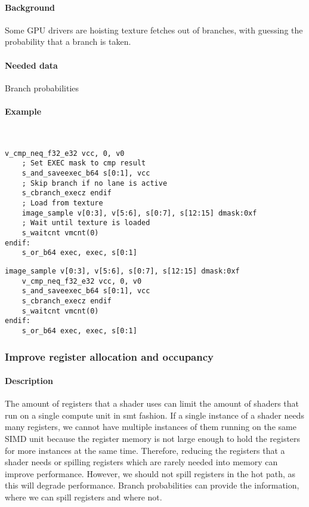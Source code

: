 \paragraph{Background} Some GPU drivers are hoisting texture fetches out of branches, with guessing the probability that a branch is taken.
\paragraph{Needed data} Branch probabilities
\paragraph{Example}\ \\
\begin{minipage}{.47\textwidth}
	\begin{lstlisting}[caption={Load Hoisting --- unoptimized},frame=tlrb,language={[amdgpu]Assembler}]
	v_cmp_neq_f32_e32 vcc, 0, v0
	; Set EXEC mask to cmp result
	s_and_saveexec_b64 s[0:1], vcc
	; Skip branch if no lane is active
	s_cbranch_execz endif
	; Load from texture
	image_sample v[0:3], v[5:6], s[0:7], s[12:15] dmask:0xf
	; Wait until texture is loaded
	s_waitcnt vmcnt(0)
endif:
	s_or_b64 exec, exec, s[0:1]
	\end{lstlisting}
\end{minipage}\hfill
\begin{minipage}{.47\textwidth}
	\begin{lstlisting}[caption={Load Hoisting --- optimized},frame=tlrb,language={[amdgpu]Assembler}]
	image_sample v[0:3], v[5:6], s[0:7], s[12:15] dmask:0xf
	v_cmp_neq_f32_e32 vcc, 0, v0
	s_and_saveexec_b64 s[0:1], vcc
	s_cbranch_execz endif
	s_waitcnt vmcnt(0)
endif:
	s_or_b64 exec, exec, s[0:1]
	\end{lstlisting}
\end{minipage}

\subsubsection{Improve register allocation and occupancy}
\paragraph{Description} The amount of registers that a shader uses can limit the amount of shaders that run on a single compute unit in \gls{smt} fashion.
If a single instance of a shader needs many registers, we cannot have multiple instances of them running on the same SIMD unit because the register memory is not large enough to hold the registers for more instances at the same time.
Therefore, reducing the registers that a shader needs or spilling registers which are rarely needed into memory can improve performance. However, we should not spill registers in the hot path, as this will degrade performance.
Branch probabilities can provide the information, where we can spill registers and where not.
